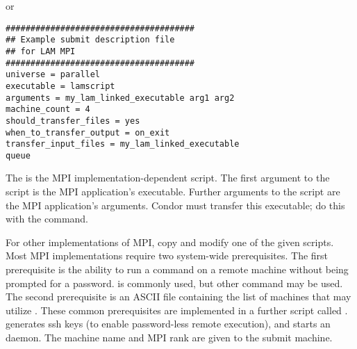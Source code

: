 or

\begin{verbatim}
######################################
## Example submit description file
## for LAM MPI
######################################
universe = parallel
executable = lamscript
arguments = my_lam_linked_executable arg1 arg2
machine_count = 4
should_transfer_files = yes
when_to_transfer_output = on_exit
transfer_input_files = my_lam_linked_executable
queue
\end{verbatim}

The  is the MPI implementation-dependent script.
The first argument to the script is the MPI application's 
executable.
Further arguments to the script are the MPI application's arguments.
Condor must transfer this executable;
do this with the  command.

For other implementations of MPI,
copy and modify one of the given scripts.
Most MPI implementations require two system-wide prerequisites.
The first prerequisite is the ability to run a command
on a remote machine without being prompted for a password.
 is commonly used, but other
command may be used.
The second prerequisite is an ASCII file containing the
list of machines that may utilize .
These common prerequisites are implemented in a further script
called .
 generates ssh keys 
(to enable password-less remote execution),
and starts an  daemon.
The machine name and MPI rank are given to the submit machine.


